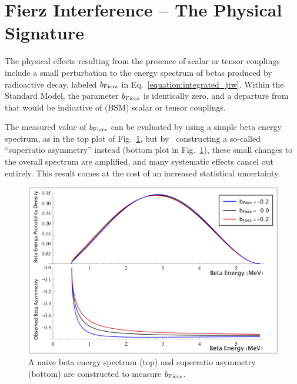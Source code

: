 \FloatBarrier  %
\section{Fierz Interference -- The Physical Signature}
\label{signature_chapter}
The physical effects resulting from the presence of scalar or tensor couplings include a small perturbation to the energy spectrum of betas produced by radioactive decay, labeled $\bFierz$ in Eq.~\ref{equation:integrated_jtw}.  Within the Standard Model, the parameter $\bFierz$ is identically zero, and a departure from that would be indicative of (BSM) scalar or tensor couplings.  

The measured value of $\bFierz$ can be evaluated by using a simple beta energy spectrum, as in the top plot of Fig.~\ref{fig:FierzSignature}, but by~ constructing a so-called ``superratio asymmetry'' instead (bottom plot in Fig.~\ref{fig:FierzSignature}), these small changes to the overall spectrum are amplified, and many systematic effects cancel out entirely.  This result comes at the cost of an increased statistical uncertainty.
\begin{figure}[h!!t]
	\centering
	\includegraphics[width=.999\linewidth]
	{Figures/Fierz_Signature.png}
	\caption[Naive Beta Energy Spectrum and Superratio Asymmetry to Measure $\bFierz$]{A naive beta energy spectrum (top) and superratio asymmetry (bottom) are constructed to measure $\bFierz$.}	
	\label{fig:FierzSignature}
\end{figure}

